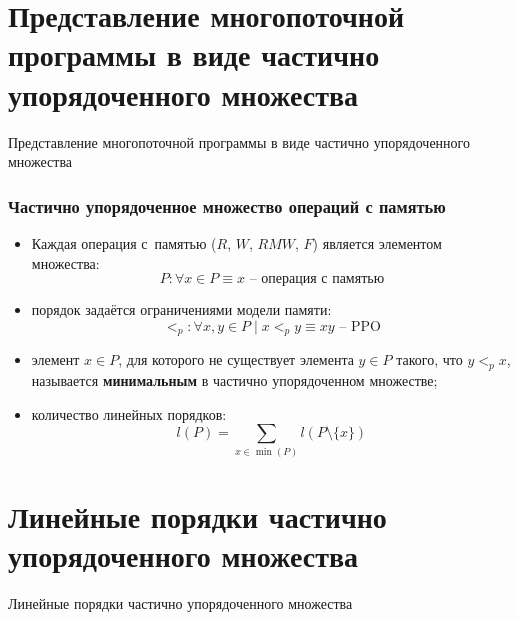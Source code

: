 \section{Представление многопоточной программы в виде частично
упорядоченного множества}
\begin{frame}[plain]
  \begin{center}
    \Huge
    Представление многопоточной программы в виде частично
    упорядоченного множества
  \end{center}
\end{frame}

\begin{frame}
  \frametitle{Частично упорядоченное множество операций с памятью}
  \begin{itemize}
    \item Каждая операция с~памятью ($R$, $W$, $RMW$, $F$) является элементом
      множества: \[P : \forall x \in P \equiv x \text{ -- операция с
      памятью} \]
    \item порядок задаётся ограничениями модели
      памяти: \[<_p : \forall x, y \in P \mid x <_p y \equiv xy
      \text{ -- PPO}\]
    \item
      элемент $x \in P$, для которого не существует элемента $y \in P$
      такого, что $y <_{p} x$, называется \textbf{минимальным} в частично
      упорядоченном множестве;
    \item количество линейных порядков: \[ l(P) = \sum_{x \in
      \min(P)} l(P \setminus \{x\})\]
  \end{itemize}

  \note{
    \[
      l(P) = l(A) \cdot l(B) \cdot \binom{|P|}{|A|}.
    \]

  }
\end{frame}

\section{Линейные порядки частично упорядоченного множества}
\begin{frame}[plain]
  \begin{center}
    \Huge
    Линейные порядки частично упорядоченного множества
  \end{center}
\end{frame}

